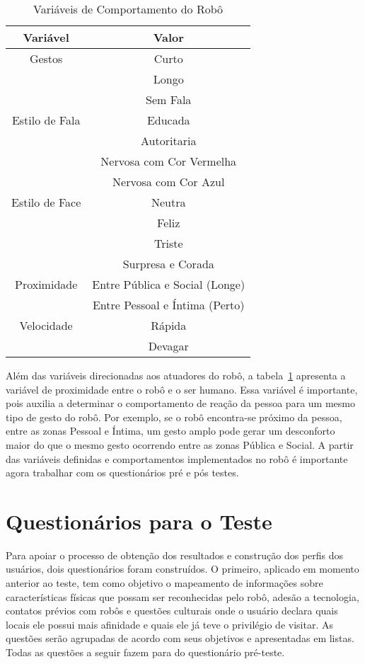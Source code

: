 \begin{table}[!ht]
	\caption{Variáveis de Comportamento do Robô}
	\label{tab:variaveisvalores}
	\centering
	\begin{tabular}{c | c}
		\hline
		Variável & Valor \\
		\hline
		Gestos & Curto \\
		& Longo \\
		\hline
		& Sem Fala \\
		Estilo de Fala & Educada \\
		& Autoritaria \\
		\hline
		& Nervosa com Cor Vermelha \\
		& Nervosa com Cor Azul \\
		Estilo de Face & Neutra \\
		& Feliz \\
		& Triste \\
		& Surpresa e Corada \\
		\hline
		Proximidade & Entre Pública e Social (Longe) \\
		& Entre Pessoal e Íntima (Perto) \\
		\hline
		Velocidade & Rápida \\
		& Devagar \\
		\hline
	\end{tabular}
\end{table}

Além das variáveis direcionadas aos atuadores do robô, a tabela~\ref{tab:variaveisvalores} apresenta a variável de proximidade entre o robô e o ser humano. Essa variável é importante, pois auxilia a determinar o comportamento de reação da pessoa para um mesmo tipo de gesto do robô. Por exemplo, se o robô encontra-se próximo da pessoa, entre as zonas Pessoal e Íntima, um gesto amplo pode gerar um desconforto maior do que o mesmo gesto ocorrendo entre as zonas Pública e Social. A partir das variáveis definidas e comportamentos implementados no robô é importante agora trabalhar com os questionários pré e pós testes.

\section{Questionários para o Teste}
\label{sec:questionarios}
Para apoiar o processo de obtenção dos resultados e construção dos perfis dos usuários, dois questionários foram construídos. O primeiro, aplicado em momento anterior ao teste, tem como objetivo o mapeamento de informações sobre características físicas que possam ser reconhecidas pelo robô, adesão a tecnologia, contatos prévios com robôs e questões culturais onde o usuário declara quais locais ele possui mais afinidade e quais ele já teve o privilégio de visitar. As questões serão agrupadas de acordo com seus objetivos e apresentadas em listas. Todas as questões a seguir fazem para do questionário pré-teste.

